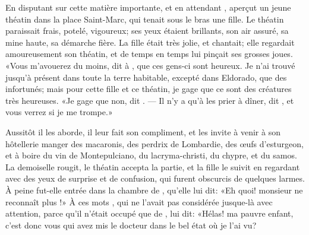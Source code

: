 En disputant sur cette matière importante, et en attendant ,
 aperçut un jeune théatin dans la place Saint-Marc, qui tenait
sous le bras une fille. Le théatin paraissait frais, potelé, vigoureux;
ses yeux étaient brillants, son air assuré, sa mine haute, sa démarche
fière. La fille était très jolie, et chantait; elle regardait
amoureusement son théatin, et de temps en temps lui pinçait ses grosses
joues. «Vous m’avouerez du moins, dit  à , que ces gens-ci
sont heureux. Je n’ai trouvé jusqu’à présent dans toute la terre
habitable, excepté dans Eldorado, que des infortunés; mais pour cette
fille et ce théatin, je gage que ce sont des créatures très heureuses.
«Je gage que non, dit . — Il n’y a qu’à les prier à dîner, dit
, et vous verrez si je me trompe.»

Aussitôt il les aborde, il leur fait son compliment, et les invite à
venir à son hôtellerie manger des macaronis, des perdrix de Lombardie,
des œufs d’esturgeon, et à boire du vin de Montepulciano, du
lacryma-christi, du chypre, et du samos. La demoiselle rougit, le
théatin accepta la partie, et la fille le suivit en regardant 
avec des yeux de surprise et de confusion, qui furent obscurcis de
quelques larmes. À peine fut-elle entrée dans la chambre de ,
qu’elle lui dit: «Eh quoi! monsieur  ne reconnaît plus !»
À ces mots , qui ne l’avait pas considérée jusque-là avec
attention, parce qu’il n’était occupé que de , lui dit: «Hélas!
ma pauvre enfant, c’est donc vous qui avez mis le docteur  dans
le bel état où je l’ai vu?



